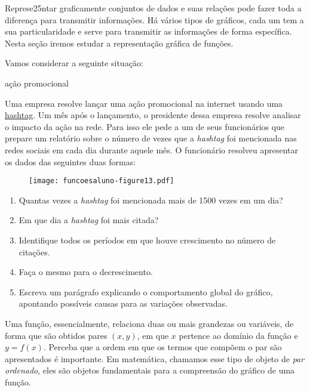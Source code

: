 \documentclass[extrafontsizes, twoside, 11pt, openright, final]{memoir}
\begin{document}
Represe25ntar graficamente conjuntos de dados e suas relações pode fazer toda a diferença para transmitir informações. Há vários tipos de gráficos, cada um tem a sua particularidade e serve para transmitir as informações de forma específica. Nesta seção iremos estudar a representação gráfica de funções.

Vamos considerar a seguinte situação:


\begin{task}{ ação promocional}
	\label{\detokenize{AF106-4:atividade-acao-promocional}}

	Uma empresa resolve lançar uma ação promocional na internet usando uma \href{https://pt.wikipedia.org/wiki/Hashtag}{hashtag}. Um mês após o lançamento, o presidente dessa empresa resolve analisar o impacto da ação na rede. Para isso ele pede a um de seus funcionários que prepare um relatório sobre o número de vezes que a \emph{hashtag} foi mencionada nas redes sociais em cada dia durante aquele mês. O funcionário resolveu apresentar os dados das seguintes duas formas:
	\begin{figure}[H]
		\begin{center}
			\centering

			\texttt{[image: funcoesaluno-figure13.pdf]}
		\end{center}
	\end{figure}

	\begin{enumerate}
		\item Quantas vezes a \emph{hashtag} foi mencionada mais de 1500 vezes em um dia?

		\item Em que dia a \emph{hashtag} foi mais citada?

		\item Identifique todos os períodos em que houve crescimento no número de citações.

		\item Faça o mesmo para o decrescimento.

		\item Escreva um parágrafo explicando o comportamento global do gráfico, apontando possíveis causas para as variações observadas.
	\end{enumerate}

\end{task}

Uma função, essencialmente, relaciona duas ou mais grandezas ou variáveis, de forma que são obtidos pares $(x,y)$, em que $x$ pertence ao domínio da função e $y=f(x)$. Perceba que a ordem em que os termos que compõem o par são apresentados é importante. Em matemática, chamamos esse tipo de objeto de \emph{par ordenado}, eles são objetos fundamentais para a compreensão do gráfico de uma função.
\end{document}
